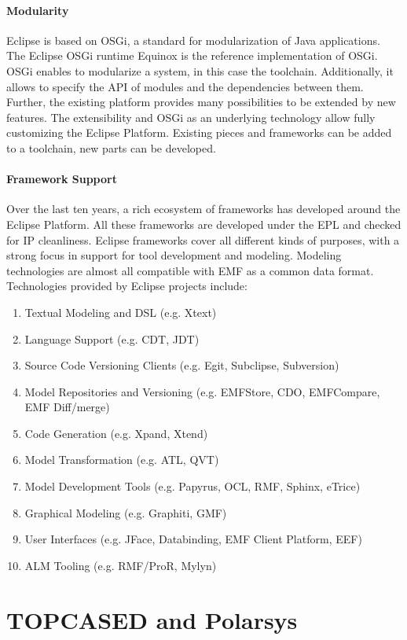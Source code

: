 \paragraph{Modularity}
Eclipse is based on OSGi, a standard for modularization of Java
applications. The Eclipse OSGi runtime Equinox is the reference
implementation of OSGi. OSGi enables to modularize a system, in this
case the toolchain. Additionally, it allows to specify the API of
modules and the dependencies between them. Further, the existing
platform provides many possibilities to be extended by new
features. The extensibility and OSGi as an underlying technology allow
fully customizing the Eclipse Platform. Existing pieces and frameworks
can be added to a toolchain, new parts can be developed.

\paragraph{Framework Support}
Over the last ten years, a rich ecosystem of frameworks has developed
around the Eclipse Platform. All these frameworks are developed under
the EPL and checked for IP cleanliness. Eclipse frameworks cover all
different kinds of purposes, with a strong focus in
support for tool development and modeling. Modeling technologies are
almost all compatible with EMF as a common data format. Technologies
provided by Eclipse projects include:
\begin{enumerate}
\item Textual Modeling and DSL (e.g. Xtext)
\item Language Support (e.g. CDT, JDT)
\item Source Code Versioning Clients (e.g. Egit, Subclipse, Subversion)
\item Model Repositories and Versioning (e.g. EMFStore, CDO, EMFCompare, EMF Diff/merge)
\item Code Generation (e.g. Xpand, Xtend)
\item Model Transformation (e.g. ATL, QVT)
\item Model Development Tools (e.g. Papyrus, OCL, RMF, Sphinx, eTrice)
\item Graphical Modeling (e.g. Graphiti, GMF)
\item User Interfaces (e.g. JFace, Databinding, EMF Client Platform, EEF)
\item ALM Tooling (e.g. RMF/ProR, Mylyn)
\end{enumerate}


\section{TOPCASED and Polarsys}

